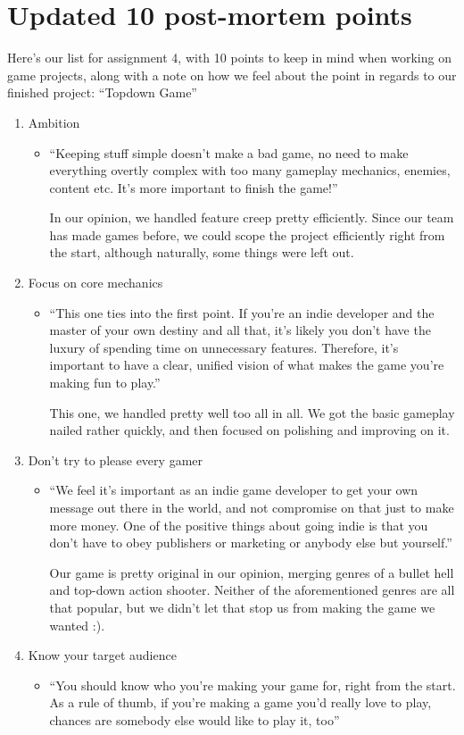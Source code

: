 \documentclass[
  oneside,
  11pt, a4paper,
  footinclude=true,
  headinclude=true,
  cleardoublepage=empty
]{scrbook}
\begin{document}
\chapter{Updated 10 post-mortem points}
Here's our list for assignment 4, with 10 points to keep in mind when working on game projects, along with a note on how we feel about the point in regards to our finished project:
``Topdown Game''
\begin{enumerate}
\item Ambition
    \begin{itemize}
    \item ``Keeping stuff simple doesn't make a bad game, no need to make everything overtly complex with too many gameplay mechanics, enemies, content etc. It's more important to finish the game!''
    
    \medskip
    In our opinion, we handled feature creep pretty efficiently. Since our team has made games before, we could scope the project efficiently right from the start, although naturally, some things were left out.
    \end{itemize}
\item Focus on core mechanics
    \begin{itemize}
    \item ``This one ties into the first point. If you're an indie developer and the master of your own destiny and all that, it's likely you don't have the luxury of spending time on unnecessary features. Therefore, it's important to have a clear, unified vision of what makes the game you're making fun to play.''
    
    \medskip
    This one, we handled pretty well too all in all. We got the basic gameplay nailed rather quickly, and then focused on polishing and improving on it.
    \end{itemize}
\item Don't try to please every gamer
    \begin{itemize}
    \item ``We feel it's important as an indie game developer to get your own message out there in the world, and not compromise on that just to make more money. One of the positive things about going indie is that you don't have to obey publishers or marketing or anybody else but yourself.''
    
    \medskip
    Our game is pretty original in our opinion, merging genres of a bullet hell and top-down action shooter. Neither of the aforementioned genres are all that popular, but we didn't let that stop us from making the game we wanted :).
    \end{itemize}
\item Know your target audience
    \begin{itemize}
    \item ``You should know who you're making your game for, right from the start. As a rule of thumb, if you're making a game you'd really love to play, chances are somebody else would like to play it, too''
    \medskip
    

\end{itemize}
\end{enumerate}
\end{document}
